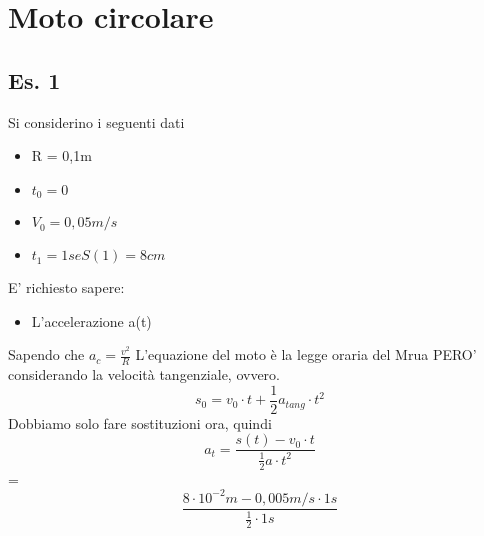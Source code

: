 \documentclass[12pt, a4paper, openany, twoside]{book}
\begin{document}
\chapter{Moto circolare}
\section{Es. 1}
Si considerino i seguenti dati
\begin{itemize}
	\item R = 0,1m
	\item $t_{0} = 0$
	\item $V_{0} = 0,05 m/s$
	\item $t_{1} = 1s e S(1) = 8cm$
\end{itemize}
E' richiesto sapere:
\begin{itemize}
	\item L'accelerazione a(t)
\end{itemize}
Sapendo che $a_{c} = \frac{v^{2}}{R}$
L'equazione del moto è la legge oraria del Mrua PERO' considerando la velocità
tangenziale, ovvero.
$$s_{0} = v_{0}\cdot t + \frac{1}{2} a_{tang}\cdot t^{2}$$
Dobbiamo solo fare sostituzioni ora, quindi 
$$a_{t} = \frac{s(t) - v_{0}\cdot t}{\frac{1}{2}a\cdot t^{2}}$$ = 
$$\frac{8\cdot 10^{-2}m - 0,005 m/s \cdot 1s}{\frac{1}{2}\cdot 1s}$$
    
\end{document}
